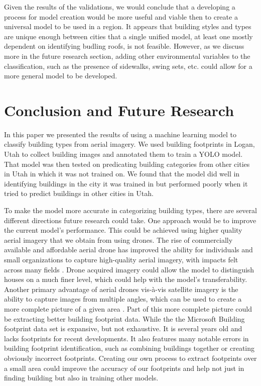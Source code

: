 \documentclass[conference,]{IEEEtran}
\begin{document}
Given the results of the validations, we would conclude that a
developing a process for model creation would be more useful and viable
then to create a universal model to be used in a region. It appears that
building styles and types are unique enough between cities that a single
unified model, at least one mostly dependent on identifying budling
roofs, is not feasible. However, as we discuss more in the future
research section, adding other environmental variables to the
classification, such as the presence of sidewalks, swing sets, etc.
could allow for a more general model to be developed.

\section{Conclusion and Future
Research}\label{conclusion-and-future-research}

In this paper we presented the results of using a machine learning model
to classify building types from aerial imagery. We used building
footprints in Logan, Utah to collect building images and annotated them
to train a YOLO model. That model was then tested on predicating
building categories from other cities in Utah in which it was not
trained on. We found that the model did well in identifying buildings in
the city it was trained in but performed poorly when it tried to predict
buildings in other cities in Utah.

To make the model more accurate in categorizing building types, there
are several different directions future research could take. One
approach would be to improve the current model's performance. This could
be achieved using higher quality aerial imagery that we obtain from
using drones. The rise of commercially available and affordable aerial
drone has improved the ability for individuals and small organizations
to capture high-quality aerial imagery, with impacts felt across many
fields \autocite{colomina_unmanned_2014,watts_unmanned_2012}. Drone
acquired imagery could allow the model to distinguish houses on a much
finer level, which could help with the model's transferability. Another
primary advantage of aerial drones vis-à-vis satellite imagery is the
ability to capture images from multiple angles, which can be used to
create a more complete picture of a given area
\autocite{berrettLargeScaleRealityModeling2021}. Part of this more
complete picture could be extracting better building footprint data.
While the the Microsoft Building footprint data set is expansive, but
not exhaustive. It is several years old and lacks footprints for recent
developments. It also features many notable errors in building footprint
identification, such as combining buildings together or creating
obviously incorrect footprints. Creating our own process to extract
footprints over a small area could improve the accuracy of our
footprints and help not just in finding building but also in training
other models.
\end{document}
